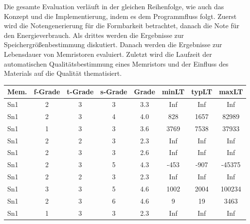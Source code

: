 Die gesamte Evaluation verläuft in der gleichen Reihenfolge, wie auch das Konzept und die Implementierung, indem es dem Programmfluss folgt. Zuerst wird die Notengenerierung für die Formbarkeit betrachtet, danach die Note für den Energieverbrauch. Als drittes werden die Ergebnisse zur Speichergrößenbestimmung diskutiert. Danach werden die Ergebnisse zur Lebensdauer von Memristoren evaluiert. Zuletzt wird die Laufzeit der automatischen Qualitätsbestimmung eines Memristors und der Einfluss des Materials auf die Qualität thematisiert.

\begin{table}
  \centering
    \begin{tabular}{l|c|c|c|c|c|c|c}
      \textbf{Mem.} & \textbf{f-Grade} & \textbf{t-Grade} & \textbf{s-Grade} & \textbf{Grade} & \textbf{minLT} & \textbf{typLT} & \textbf{maxLT} \\\hline
       Sn1           &  2               & 3                &  3               &  3.3           & Inf            & Inf            & Inf     \\
       Sn1           &  2               & 3                &  4               &  4.0           & 828            & 1657           & 82989   \\
       Sn1           &  1               & 3                &  3               &  3.6           & 3769           & 7538           & 37933   \\
       Sn1           &  2               & 2                &  3               &  2.3           & Inf            & Inf            & Inf     \\
       Sn1           &  2               & 3                &  3               &  2.6           & Inf            & Inf            & Inf     \\
       Sn1           &  2               & 3                &  5               &  4.3           & -453           & -907           & -45375  \\
       Sn1           &  2               & 2                &  3               &  2.3           & Inf            & Inf            & Inf     \\
       Sn1           &  3               & 3                &  5               &  4.6           & 1002           & 2004           & 100234  \\
       Sn1           &  2               & 3                &  6               &  4.6           & 9              & 19             & 3463    \\
       Sn1           &  1               & 3                &  3               &  2.3           & Inf            & Inf            & Inf     \\

\end{tabular}
\end{table}
